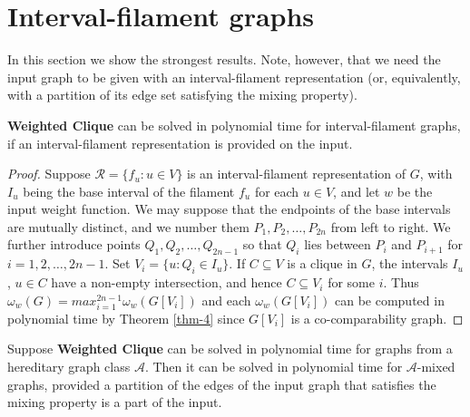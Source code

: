 \section{Interval-filament graphs}

In this section we show the strongest results. Note, however, that we need the input graph to be given with an interval-filament representation (or, equivalently, with a partition of its edge set satisfying the mixing property).

\begin{thm}
	\textbf{Weighted Clique} can be solved in polynomial time for interval-filament graphs, if an interval-filament representation is provided on the input.
\end{thm}

\begin{proof}
	Suppose $\mathcal{R} = \{f_u : u \in V \}$ is an interval-filament representation of $G$, with $I_u$ being the base	interval of the filament $f_u$ for each $u \in V$, and let $w$ be the input weight function. We may suppose that the endpoints of the base intervals are mutually distinct, and we number them $P_1 , P_2 , \dots , P_{2n}$ from left to right. We further introduce points $Q_1 , Q_2 , \dots , Q_{2n-1}$ so that $Q_i$ lies between $P_i$ and $P_{i+1}$ for $i = 1, 2, \dots, 2n - 1$. Set $V_i = \{u : Q_i \in I_u\}$. If $C \subseteq V$ is a clique in $G$, the intervals $I_u$, $u \in C$ have a non-empty intersection, and hence $C \subseteq V_i$ for some $i$. Thus $\omega_w(G) = max_{i=1}^{2n-1} \omega_w (G[V_i])$ and each $\omega_w (G[V_i])$ can be computed in polynomial time by Theorem \ref{thm-4} since $G[V_i]$ is a co-comparability graph.
\end{proof}

\begin{thm}
	Suppose \textbf{Weighted Clique} can be solved in polynomial time for graphs from a	hereditary graph class $\mathcal{A}$. Then it can be solved in polynomial time for $\mathcal{A}$-mixed graphs, provided a partition of the edges of the input graph that satisfies the mixing property is a part of the input.
	\label{thm-6}
\end{thm}

